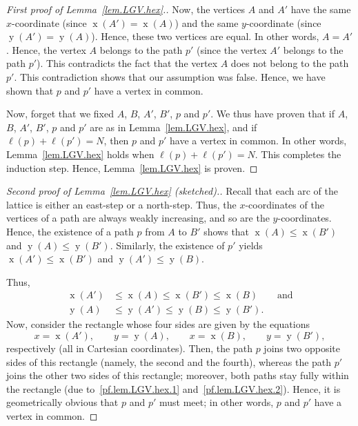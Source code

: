 \documentclass[reqno]{amsart}
\newcommand{\0}{\phantom{c}}
\DeclareMathOperator{\xcoord}{x} %
\DeclareMathOperator{\ycoord}{y} %
\newenvironment{verlong}{}{}
\theoremstyle{plain}
\theoremstyle{definition}
\numberwithin{equation}{section}
\begin{document}
\begin{verlong}
\begin{proof}[First proof of Lemma~\ref{lem.LGV.hex}.]
Now, the vertices $A$ and $A'$ have the same $x$-coordinate (since $\xcoord(A') = \xcoord(A)$) and the same $y$-coordinate (since $\ycoord(A') = \ycoord(A)$).
Hence, these two vertices are equal.
In other words, $A = A'$.
Hence, the vertex $A$ belongs to the path $p'$ (since the vertex $A'$ belongs to the path $p'$).
This contradicts the fact that the vertex $A$ does not belong to the path $p'$.
This contradiction shows that our assumption was false.
Hence, we have shown that $p$ and $p'$ have a vertex in common.

Now, forget that we fixed $A$, $B$, $A'$, $B'$, $p$ and $p'$.
We thus have proven that if $A$, $B$, $A'$, $B'$, $p$ and $p'$ are as in Lemma~\ref{lem.LGV.hex}, and if $\ell(p) + \ell(p') = N$, then $p$ and $p'$ have a vertex in common.
In other words, Lemma~\ref{lem.LGV.hex} holds when $\ell(p) + \ell(p') = N$.
This completes the induction step.
Hence, Lemma~\ref{lem.LGV.hex} is proven.
\end{proof}

\begin{proof}[Second proof of Lemma~\ref{lem.LGV.hex} (sketched).]
Recall that each arc of the lattice is either an east-step or a north-step.
Thus, the $x$-coordinates of the vertices of a path are always weakly increasing, and so are the $y$-coordinates.
Hence, the existence of a path $p$ from $A$ to $B'$ shows that $\xcoord(A) \leq \xcoord(B')$ and $\ycoord(A) \leq \ycoord(B')$.
Similarly, the existence of $p'$ yields $\xcoord(A') \leq \xcoord(B')$ and $\ycoord(A') \leq\ycoord(B)$.

Thus,
\begin{align}
\xcoord(A')  & \leq \xcoord(A)  \leq \xcoord(B') \leq \xcoord(B) \qquad \text{and} \label{pf.lem.LGV.hex.1} \\
\ycoord(A)  & \leq \ycoord(A') \leq \ycoord(B) \leq \ycoord(B'). \label{pf.lem.LGV.hex.2}
\end{align}
Now, consider the rectangle whose four sides are given by the equations
\[
x = \xcoord(A'), \qquad
y = \ycoord(A), \qquad
x = \xcoord(B), \qquad
y = \ycoord(B'),
\]
respectively (all in Cartesian coordinates).
Then, the path $p$ joins two opposite sides of this rectangle (namely, the second and the fourth), whereas
the path $p'$ joins the other two sides of this rectangle; moreover, both paths stay fully within the rectangle (due to~\eqref{pf.lem.LGV.hex.1} and~\eqref{pf.lem.LGV.hex.2}).
Hence, it is geometrically obvious that $p$ and $p'$ must meet; in other words, $p$ and $p'$ have a vertex in common.


\end{proof}
\end{verlong}
\end{document}
